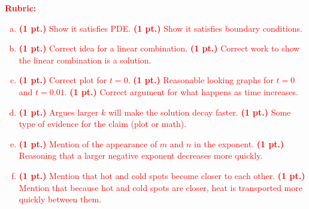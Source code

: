\documentclass[12pt]{article} %
\begin{document}
\textcolor{red}{
\noindent \textbf{Rubric:}
\begin{enumerate}[(a)]
    \item \textbf{(1 pt.)} Show it satisfies PDE. \textbf{(1 pt.)} Show it satisfies boundary conditions. 
	\item \textbf{(1 pt.)} Correct idea for a linear combination. \textbf{(1 pt.)} Correct work to show the linear combination is a solution.
	\item \textbf{(1 pt.)} Correct plot for $t=0$. \textbf{(1 pt.)} Reasonable looking graphs for $t=0$ and $t=0.01$. \textbf{(1 pt.)} Correct argument for what happens as time increases.
	\item \textbf{(1 pt.)} Argues larger $k$ will make the solution decay faster. \textbf{(1 pt.)} Some type of evidence for the claim (plot or math).
	\item \textbf{(1 pt.)} Mention of the appearance of $m$ and $n$ in the exponent. \textbf{(1 pt.)} Reasoning that a larger negative exponent decreases more quickly.
	\item \textbf{(1 pt.)} Mention that hot and cold spots become closer to each other. \textbf{(1 pt.)} Mention that because hot and cold spots are closer, heat is transported more quickly between them.
\end{enumerate}
}
\end{document}
